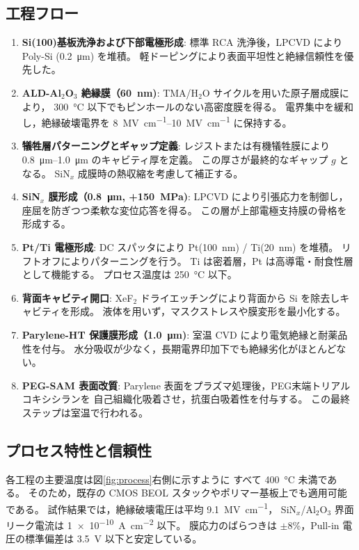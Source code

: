 \subsection{工程フロー}
\begin{enumerate}[label=(\arabic*), leftmargin=6mm]
\item \textbf{Si(100)基板洗浄および下部電極形成}:  
標準 RCA 洗浄後，LPCVD により Poly-Si (\SI{0.2}{\micro\meter}) を堆積。
軽ドーピングにより表面平坦性と絶縁信頼性を優先した。

\item \textbf{ALD-Al$_2$O$_3$ 絶縁膜（\SI{60}{\nano\meter})}:  
TMA/H$_2$O サイクルを用いた原子層成膜により，
\SI{300}{\celsius} 以下でもピンホールのない高密度膜を得る。
電界集中を緩和し，絶縁破壊電界を \SIrange{8}{10}{\mega\volt\per\centi\meter} に保持する。

\item \textbf{犠牲層パターニングとギャップ定義}:  
レジストまたは有機犠牲膜により \SIrange{0.8}{1.0}{\micro\meter} のキャビティ厚を定義。
この厚さが最終的なギャップ $g$ となる。
SiN$_x$ 成膜時の熱収縮を考慮して補正する。

\item \textbf{SiN$_x$ 膜形成（\SI{0.8}{\micro\meter}, +\SI{150}{\mega\pascal})}:  
LPCVD により引張応力を制御し，座屈を防ぎつつ柔軟な変位応答を得る。
この層が上部電極支持膜の骨格を形成する。

\item \textbf{Pt/Ti 電極形成}:  
DC スパッタにより Pt(\SI{100}{\nano\meter}) / Ti(\SI{20}{\nano\meter}) を堆積。
リフトオフによりパターニングを行う。
Ti は密着層，Pt は高導電・耐食性層として機能する。
プロセス温度は \SI{250}{\celsius} 以下。

\item \textbf{背面キャビティ開口}:  
XeF$_2$ ドライエッチングにより背面から Si を除去しキャビティを形成。
液体を用いず，マスクストレスや膜変形を最小化する。

\item \textbf{Parylene-HT 保護膜形成（\SI{1.0}{\micro\meter})}:  
室温 CVD により電気絶縁と耐薬品性を付与。
水分吸収が少なく，長期電界印加下でも絶縁劣化がほとんどない。

\item \textbf{PEG-SAM 表面改質}:  
Parylene 表面をプラズマ処理後，PEG末端トリアルコキシシランを
自己組織化吸着させ，抗蛋白吸着性を付与する。
この最終ステップは室温で行われる。
\end{enumerate}

\subsection{プロセス特性と信頼性}
各工程の主要温度は図\ref{fig:process}右側に示すように
すべて \SI{400}{\celsius} 未満である。
そのため，既存の CMOS BEOL スタックやポリマー基板上でも適用可能である。
試作結果では，絶縁破壊電圧は平均 \SI{9.1}{\mega\volt\per\centi\meter}，
SiN$_x$/Al$_2$O$_3$ 界面リーク電流は \SI{1e-10}{\ampere\per\centi\meter\squared} 以下。
膜応力のばらつきは $\pm$8\%，Pull-in 電圧の標準偏差は \SI{3.5}{\volt} 以下と安定している。


